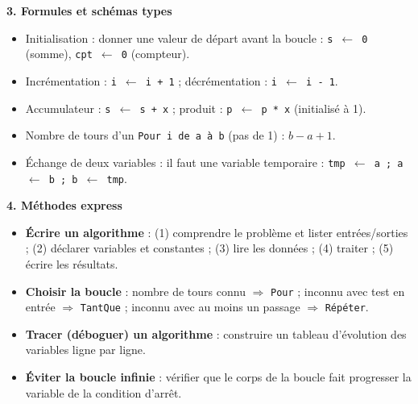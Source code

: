\documentclass[11pt]{article}
\newcommand{\cle}[1]{{\popxbold\color{popdark}#1}}
\begin{document}
\begin{bilan}
\textbf{3. Formules et schémas types}
\begin{itemize}
  \item \cle{Initialisation} : donner une valeur de départ avant la boucle : \texttt{s $\leftarrow$ 0} (somme), \texttt{cpt $\leftarrow$ 0} (compteur).
  \item \cle{Incrémentation} : \texttt{i $\leftarrow$ i + 1} ; \cle{décrémentation} : \texttt{i $\leftarrow$ i - 1}.
  \item Accumulateur : \texttt{s $\leftarrow$ s + x} ; produit : \texttt{p $\leftarrow$ p * x} (initialisé à 1).
  \item Nombre de tours d'un \texttt{Pour i de a à b} (pas de 1) : $b - a + 1$.
  \item Échange de deux variables : il faut une variable temporaire :
  \texttt{tmp $\leftarrow$ a ; a $\leftarrow$ b ; b $\leftarrow$ tmp}.
\end{itemize}

\textbf{4. Méthodes express}
\begin{itemize}
  \item \textbf{Écrire un algorithme} : (1) comprendre le problème et lister entrées/sorties ; (2) déclarer variables et constantes ; (3) lire les données ; (4) traiter ; (5) écrire les résultats.
  \item \textbf{Choisir la boucle} : nombre de tours connu $\Rightarrow$ \texttt{Pour} ; inconnu avec test en entrée $\Rightarrow$ \texttt{TantQue} ; inconnu avec au moins un passage $\Rightarrow$ \texttt{Répéter}.
  \item \textbf{Tracer (déboguer) un algorithme} : construire un tableau d'évolution des variables ligne par ligne.
  \item \textbf{Éviter la boucle infinie} : vérifier que le corps de la boucle fait progresser la variable de la condition d'arrêt.
\end{itemize}
\end{bilan}
\end{document}
